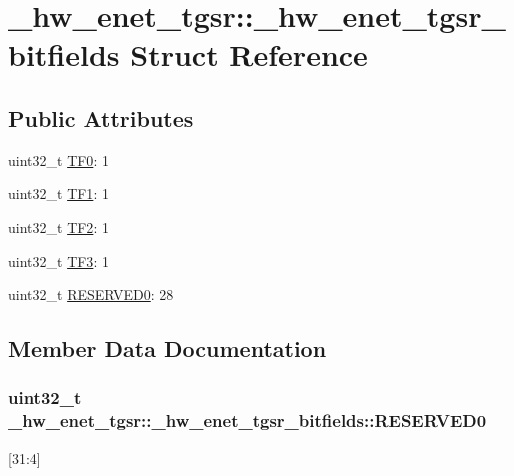 \hypertarget{struct__hw__enet__tgsr_1_1__hw__enet__tgsr__bitfields}{}\section{\+\_\+hw\+\_\+enet\+\_\+tgsr\+:\+:\+\_\+hw\+\_\+enet\+\_\+tgsr\+\_\+bitfields Struct Reference}
\label{struct__hw__enet__tgsr_1_1__hw__enet__tgsr__bitfields}
\subsection*{Public Attributes}
\begin{DoxyCompactItemize}
\item 
uint32\+\_\+t \hyperlink{struct__hw__enet__tgsr_1_1__hw__enet__tgsr__bitfields_ac5eea7225784fd3a68582ddc02903144}{T\+F0}\+: 1
\item 
uint32\+\_\+t \hyperlink{struct__hw__enet__tgsr_1_1__hw__enet__tgsr__bitfields_ac0a23e92e6b3a5c6285be2cabee41be0}{T\+F1}\+: 1
\item 
uint32\+\_\+t \hyperlink{struct__hw__enet__tgsr_1_1__hw__enet__tgsr__bitfields_a473a7c4a9a157386b5e8178b8a865d57}{T\+F2}\+: 1
\item 
uint32\+\_\+t \hyperlink{struct__hw__enet__tgsr_1_1__hw__enet__tgsr__bitfields_aea736b4adfff9def2d45e06a4e50dda3}{T\+F3}\+: 1
\item 
uint32\+\_\+t \hyperlink{struct__hw__enet__tgsr_1_1__hw__enet__tgsr__bitfields_ad5c49e090cc88125b787921ba2e83c85}{R\+E\+S\+E\+R\+V\+E\+D0}\+: 28
\end{DoxyCompactItemize}


\subsection{Member Data Documentation}
\subsubsection[{\texorpdfstring{R\+E\+S\+E\+R\+V\+E\+D0}{RESERVED0}}]{\setlength{\rightskip}{0pt plus 5cm}uint32\+\_\+t \+\_\+hw\+\_\+enet\+\_\+tgsr\+::\+\_\+hw\+\_\+enet\+\_\+tgsr\+\_\+bitfields\+::\+R\+E\+S\+E\+R\+V\+E\+D0}\hypertarget{struct__hw__enet__tgsr_1_1__hw__enet__tgsr__bitfields_ad5c49e090cc88125b787921ba2e83c85}{}\label{struct__hw__enet__tgsr_1_1__hw__enet__tgsr__bitfields_ad5c49e090cc88125b787921ba2e83c85}
\mbox{[}31\+:4\mbox{]} 
